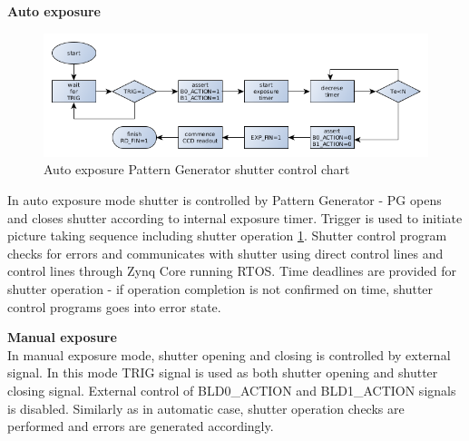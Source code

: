 \begin{description}

\item \textbf{Auto exposure} \hfill \\

\begin{figure}[H]
\centering
\includegraphics[width=\textwidth]{pict_ipc/shut_ctrl_auto.png}
\caption{Auto exposure Pattern Generator shutter control chart}
\label{fig:shutctrlauto}
\end{figure}

In auto exposure mode shutter is controlled by Pattern Generator - PG opens and closes shutter according to internal exposure timer. Trigger is used to initiate picture taking sequence including shutter operation \ref{fig:shutctrlauto}. Shutter control program checks for errors and communicates with shutter using direct control lines  and control lines through Zynq Core running RTOS. Time deadlines are provided for shutter operation - if operation completion is not confirmed on time, shutter control programs goes into error state.

\item \textbf{Manual exposure} \hfill \\
In manual exposure mode, shutter opening and closing is controlled by external signal. In this mode TRIG signal is used as both shutter opening and shutter closing signal. External control of BLD0\_ACTION and BLD1\_ACTION signals is disabled. Similarly as in automatic case, shutter operation checks are performed and errors are generated accordingly.


\end{description}
